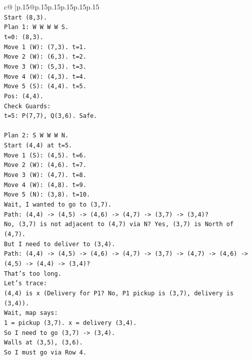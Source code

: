 \documentclass{article}
\begin{document}
{\begin{supertabular}{c@{$\;$}|p{.15\linewidth}@{}p{.15\linewidth}p{.15\linewidth}p{.15\linewidth}p{.15\linewidth}p{.15\linewidth}}
{{{\\ 
\texttt{Start (8,3).} \\
\texttt{Plan 1: W W W W S.} \\
\texttt{t=0: (8,3).} \\
\texttt{Move 1 (W): (7,3). t=1.} \\
\texttt{Move 2 (W): (6,3). t=2.} \\
\texttt{Move 3 (W): (5,3). t=3.} \\
\texttt{Move 4 (W): (4,3). t=4.} \\
\texttt{Move 5 (S): (4,4). t=5.} \\
\texttt{Pos: (4,4).} \\
\texttt{Check Guards:} \\
\texttt{t=5: P(7,7), Q(3,6). Safe.} \\
\\ 
\texttt{Plan 2: S W W W N.} \\
\texttt{Start (4,4) at t=5.} \\
\texttt{Move 1 (S): (4,5). t=6.} \\
\texttt{Move 2 (W): (4,6). t=7.} \\
\texttt{Move 3 (W): (4,7). t=8.} \\
\texttt{Move 4 (W): (4,8). t=9.} \\
\texttt{Move 5 (N): (3,8). t=10.} \\
\texttt{Wait, I wanted to go to (3,7).} \\
\texttt{Path: (4,4) {-}> (4,5) {-}> (4,6) {-}> (4,7) {-}> (3,7) {-}> (3,4)?} \\
\texttt{No, (3,7) is not adjacent to (4,7) via N? Yes, (3,7) is North of (4,7).} \\
\texttt{But I need to deliver to (3,4).} \\
\texttt{Path: (4,4) {-}> (4,5) {-}> (4,6) {-}> (4,7) {-}> (3,7) {-}> (4,7) {-}> (4,6) {-}> (4,5) {-}> (4,4) {-}> (3,4)?} \\
\texttt{That's too long.} \\
\texttt{Let's trace:} \\
\texttt{(4,4) is x (Delivery for P1? No, P1 pickup is (3,7), delivery is (3,4)).} \\
\texttt{Wait, map says:} \\
\texttt{1 = pickup (3,7). x = delivery (3,4).} \\
\texttt{So I need to go (3,7) {-}> (3,4).} \\
\texttt{Walls at (3,5), (3,6).} \\
\texttt{So I must go via Row 4.} \\
}}}
\end{supertabular}}
\end{document}
